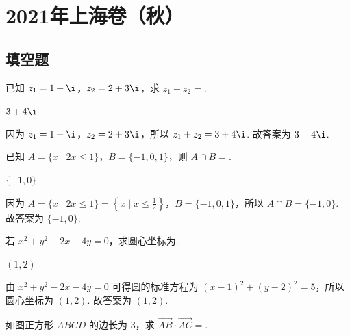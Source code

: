
\chapter{2021年上海卷（秋）}

\section{填空题}

\begin{problem}
已知 \(z_1=1+\i\)，\(z_2=2+3\i\)，求 \(z_1+z_2=\)\fillinblank{}.
\end{problem}

\begin{answer}
\(3+4\i\)
\end{answer}

\begin{solution}
因为 \(z_1=1+\i\)，\(z_2=2+3\i\)，所以 \(z_1+z_2=3+4\i\). 故答案为 \(3+4\i\).
\end{solution}

\begin{problem}
已知 \(A=\{x\mid 2x\le 1\}\)，\(B=\{-1,0,1\}\)，则 \(A\cap B=\)\fillinblank{}.
\end{problem}

\begin{answer}
\(\{-1,0\}\)
\end{answer}

\begin{solution}
因为 \(A=\{x\mid 2x\le 1\}=\left\{x\mid x\le \frac12\right\}\)，\(B=\{-1,0,1\}\)，所以 \(A\cap B=\{-1,0\}\). 故答案为 \(\{-1,0\}\).
\end{solution}

\begin{problem}
若 \(x^2+y^2-2x-4y=0\)，求圆心坐标为\fillinblank{}.
\end{problem}

\begin{answer}
\((1,2)\)
\end{answer}

\begin{solution}
由 \(x^2+y^2-2x-4y=0\) 可得圆的标准方程为 \(\left( x-1 \right)^2+\left( y-2 \right)^2=5\)，所以圆心坐标为 \((1,2)\). 故答案为 \((1,2)\).
\end{solution}

\begin{problem}
如图正方形 \(ABCD\) 的边长为 \(3\)，求 \(\overrightarrow{AB}\cdot \overrightarrow{AC}=\)\fillinblank{}.

\end{problem}


